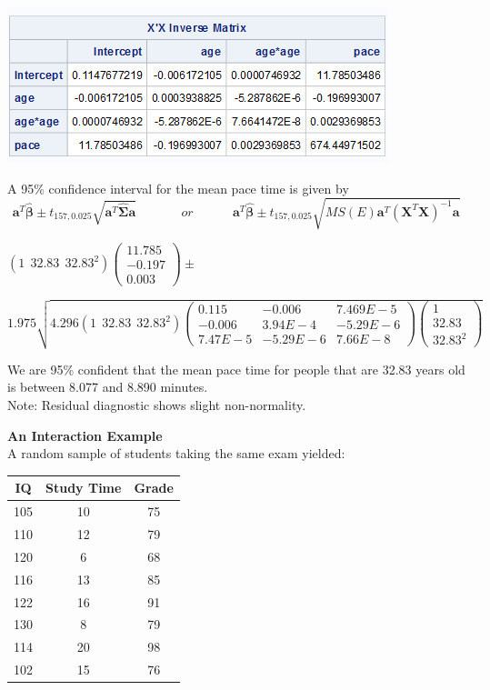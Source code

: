 \begin{center}
\includegraphics[scale=0.7]{xpxinverse}
\end{center}

A 95\% confidence interval for the mean pace time is given by
$$\textbf{a}^{T}\boldsymbol{\hat{\beta}}\pm t_{157,0.025}\sqrt{\textbf{a}^{T}\boldsymbol{\hat{\Sigma}}\textbf{a}}~~~~~~~~~~~~~~~~or~~~~~~~~~~~~~~\textbf{a}^{T}\boldsymbol{\hat{\beta}}\pm t_{157,0.025}\sqrt{MS(E)\textbf{a}^{T}\left(\textbf{X}^{T}\textbf{X}\right)^{-1}\textbf{a}}$$
\begin{flushleft}
$(1~~32.83~~32.83^2)\left(\begin{array}{c}11.785\\-0.197\\0.003\end{array}\right)\pm $
\end{flushleft}
\begin{flushright}
$1.975\sqrt{4.296(1~~32.83~~32.83^2)\left(\begin{array}{ccc} 0.115 &-0.006 &7.469E-5 \\-0.006& 3.94E-4 & -5.29E-6 \\ 7.47E-5 & -5.29E-6 &7.66E-8 \end{array}\right) \left(\begin{array}{c}1 \\32.83\\ 32.83^2\end{array}\right)}$
\end{flushright}

We are 95\% confident that the mean pace time for people that are 32.83 years old is between 8.077 and 8.890 minutes.\\

Note: Residual diagnostic shows slight non-normality.

\newpage

\Large\textbf{An Interaction Example}\large\\
A random sample of students taking the same exam yielded:
\begin{center}
\begin{tabular}{|c|c|c|} \hline
IQ & Study Time & Grade \\ \hline
105 & 10 & 75 \\
110 & 12 & 79 \\
120 & 6 & 68 \\
116 & 13 & 85 \\
122 & 16 & 91 \\
130 & 8 & 79 \\
114 & 20 & 98 \\
102 & 15 & 76 \\ \hline
\end{tabular}
\end{center}

